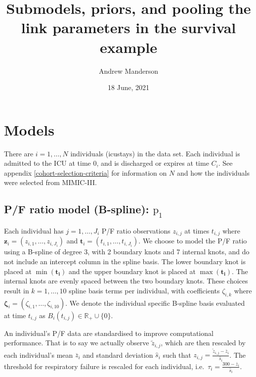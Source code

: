 \documentclass[
  10pt,
  a4paper,
]{article}
\title{Submodels, priors, and pooling the link parameters in the
survival example}
\author{Andrew Manderson}
\date{18 June, 2021}
\newcommand{\pd}{\text{p}}
\begin{document}
\maketitle

\hypertarget{models}{%
\section{Models}\label{models}}

There are \(i = 1, \ldots, N\) individuals (icustays) in the data set.
Each individual is admitted to the ICU at time \(0\), and is discharged
or expires at time \(C_{i}\). See appendix
\ref{cohort-selection-criteria} for information on \(N\) and how the
individuals were selected from MIMIC-III.

\hypertarget{pf-ratio-model-b-spline-pd_1}{%
\subsection{\texorpdfstring{P/F ratio model (B-spline):
\(\pd_{1}\)}{P/F ratio model (B-spline): \textbackslash pd\_\{1\}}}\label{pf-ratio-model-b-spline-pd_1}}

Each individual has \(j = 1, \ldots, J_{i}\) P/F ratio observations
\(z_{i, j}\) at times \(t_{i, j}\) where
\(\boldsymbol{z}_{i} = (z_{i, 1}, \ldots, z_{i, J_{i}})\) and
\(\boldsymbol{t}_{i} = (t_{i, 1}, \ldots, t_{i, J_{i}})\). We choose to
model the P/F ratio using a B-spline of degree 3, with 2 boundary knots
and 7 internal knots, and do not include an intercept column in the
spline basis. The lower boundary knot is placed at
\(\min(\boldsymbol{t_{i}})\) and the upper boundary knot is placed at
\(\max(\boldsymbol{t_{i}})\). The internal knots are evenly spaced
between the two boundary knots. These choices result in
\(k = 1, \ldots, 10\) spline basis terms per individual, with
coefficients \(\zeta_{i, k}\) where
\(\boldsymbol{\zeta}_{i} = (\zeta_{i, 1}, \ldots, \zeta_{i, 10})\). We
denote the individual specific B-spline basis evaluated at time
\(t_{i, j}\) as \(B_{i}(t_{i, j}) \in \mathbb{R}_{+} \cup \{0\}\).

An individual's P/F data are standardised to improve computational
performance. That is to say we actually observe \(\tilde{z}_{i, j}\),
which are then rescaled by each individual's mean \(\overline{z}_{i}\)
and standard deviation \(\hat{s}_{i}\) such that
\(z_{i, j} = \frac{\tilde{z}_{i, j} - \overline{z}_{i}}{\hat{s}_{i}}\).
The threshold for respiratory failure is rescaled for each individual,
i.e.~\(\tau_{i} = \frac{300 - \overline{z}_{i}}{\hat{s}_{i}}\).
\end{document}
